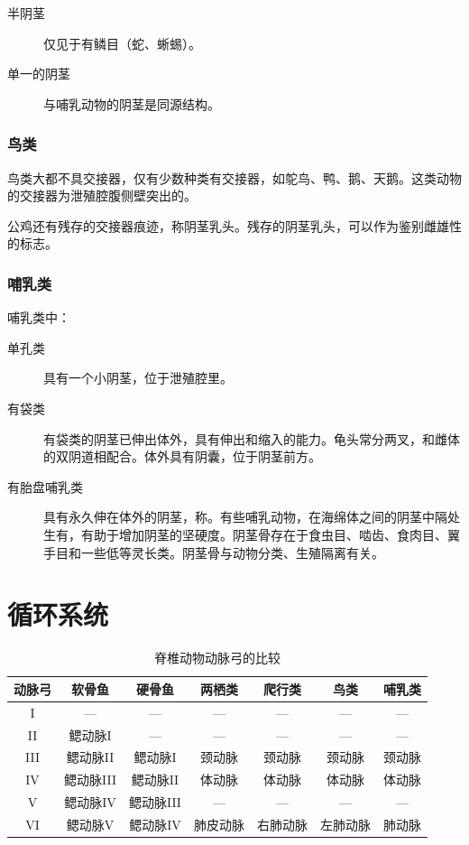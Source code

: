 \begin{description}
	\item[半阴茎] 仅见于有鳞目（蛇、蜥蜴）。
	\item[单一的阴茎] 与哺乳动物的阴茎是同源结构。
\end{description}

\subsubsection{鸟类}

鸟类大都不具交接器，仅有少数种类有交接器，如鸵鸟、鸭、鹅、天鹅。这类动物的交接器为泄殖腔腹侧壁突出的。

公鸡还有残存的交接器痕迹，称阴茎乳头。残存的阴茎乳头，可以作为鉴别雌雄性的标志。

\subsubsection{哺乳类}

哺乳类中：

\begin{description}
	\item[单孔类] 具有一个小阴茎，位于泄殖腔里。
	\item[有袋类] 有袋类的阴茎已伸出体外，具有伸出和缩入的能力。龟头常分两叉，和雌体的双阴道相配合。体外具有阴囊，位于阴茎前方。
	\item[有胎盘哺乳类] 具有永久伸在体外的阴茎，称。有些哺乳动物，在海绵体之间的阴茎中隔处生有，有助于增加阴茎的坚硬度。阴茎骨存在于食虫目、啮齿、食肉目、翼手目和一些低等灵长类。阴茎骨与动物分类、生殖隔离有关。
\end{description}

\section{循环系统}

\begin{table}[htbp]
	\centering
	\begin{tabularx}{\textwidth}{|c|C|C|c|c|c|c|}
		\hline
		动脉弓 & 软骨鱼 & 硬骨鱼 & 两栖类 & 爬行类 & 鸟类 & 哺乳类 \\ \hline
		I & --- & --- & --- & --- & --- & --- \\ \hline
		II & 鳃动脉I & --- & --- & --- & --- & --- \\ \hline
		III & 鳃动脉II & 鳃动脉I & 颈动脉 & 颈动脉 & 颈动脉 & 颈动脉 \\ \hline
		IV & 鳃动脉III & 鳃动脉II & 体动脉 & 体动脉 & 体动脉 & 体动脉 \\ \hline
		V & 鳃动脉IV & 鳃动脉III & --- & --- & --- & --- \\ \hline
		VI & 鳃动脉V & 鳃动脉IV & 肺皮动脉 & 右肺动脉 & 左肺动脉 & 肺动脉 \\ \hline
	\end{tabularx}
	\caption{脊椎动物动脉弓的比较}
	\label{tab:Comparative_Aortic_Arches_Vertebrates}
\end{table}






